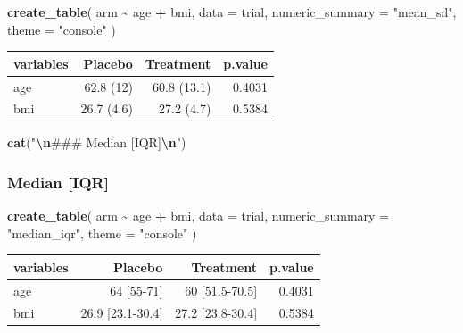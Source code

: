 \documentclass[
]{article}
\newenvironment{Shaded}{\begin{snugshade}}{\end{snugshade}}
\newcommand{\AttributeTok}[1]{\textcolor[rgb]{0.13,0.29,0.53}{#1}}
\newcommand{\FunctionTok}[1]{\textcolor[rgb]{0.13,0.29,0.53}{\textbf{#1}}}
\newcommand{\NormalTok}[1]{#1}
\newcommand{\SpecialCharTok}[1]{\textcolor[rgb]{0.81,0.36,0.00}{\textbf{#1}}}
\newcommand{\StringTok}[1]{\textcolor[rgb]{0.31,0.60,0.02}{#1}}
\begin{document}
\begin{Shaded}
\begin{Highlighting}[]
\FunctionTok{create\_table}\NormalTok{(}
\NormalTok{  arm }\SpecialCharTok{\textasciitilde{}}\NormalTok{ age }\SpecialCharTok{+}\NormalTok{ bmi, }\AttributeTok{data =}\NormalTok{ trial,}
  \AttributeTok{numeric\_summary =} \StringTok{"mean\_sd"}\NormalTok{, }\AttributeTok{theme =} \StringTok{"console"}
\NormalTok{)}
\end{Highlighting}
\end{Shaded}

\begin{tabular}{lrrr}
\hline
variables & Placebo & Treatment & p.value \\
\hline
age & 62.8 (12) & 60.8 (13.1) & 0.4031 \\
bmi & 26.7 (4.6) & 27.2 (4.7) & 0.5384 \\
\hline
\end{tabular}

\begin{Shaded}
\begin{Highlighting}[]
\FunctionTok{cat}\NormalTok{(}\StringTok{"}\SpecialCharTok{\textbackslash{}n}\StringTok{\#\#\# Median [IQR]}\SpecialCharTok{\textbackslash{}n}\StringTok{"}\NormalTok{)}
\end{Highlighting}
\end{Shaded}

\subsubsection{Median {[}IQR{]}}\label{median-iqr}

\begin{Shaded}
\begin{Highlighting}[]
\FunctionTok{create\_table}\NormalTok{(}
\NormalTok{  arm }\SpecialCharTok{\textasciitilde{}}\NormalTok{ age }\SpecialCharTok{+}\NormalTok{ bmi, }\AttributeTok{data =}\NormalTok{ trial,}
  \AttributeTok{numeric\_summary =} \StringTok{"median\_iqr"}\NormalTok{, }\AttributeTok{theme =} \StringTok{"console"}
\NormalTok{)}
\end{Highlighting}
\end{Shaded}

\begin{tabular}{lrrr}
\hline
variables & Placebo & Treatment & p.value \\
\hline
age & 64 [55-71] & 60 [51.5-70.5] & 0.4031 \\
bmi & 26.9 [23.1-30.4] & 27.2 [23.8-30.4] & 0.5384 \\
\hline
\end{tabular}
\end{document}
